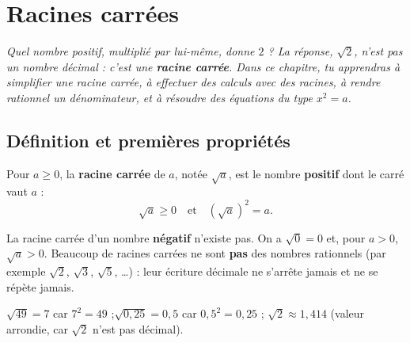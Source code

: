 \chapter{Racines carrées}

\noindent\textit{Quel nombre positif, multiplié par lui-même, donne $2$ ? La réponse,
$\sqrt2$, n'est pas un nombre décimal : c'est une \textbf{racine carrée}. Dans ce chapitre,
tu apprendras à simplifier une racine carrée, à effectuer des calculs avec des racines, à
rendre rationnel un dénominateur, et à résoudre des équations du type $x^{2}=a$.}
\vspace{8pt}

\connecteBanner

\section{Définition et premières propriétés}

\begin{definition}
Pour $a\ge0$, la \textbf{racine carrée} de $a$, notée $\sqrt a$, est le nombre
\textbf{positif} dont le carré vaut $a$ :
\[
\sqrt a\ge0 \quad\text{et}\quad \left(\sqrt a\right)^{2}=a.
\]
\end{definition}

\begin{remarque}
La racine carrée d'un nombre \textbf{négatif} n'existe pas. On a $\sqrt0=0$ et, pour $a>0$,
$\sqrt a>0$. Beaucoup de racines carrées ne sont \textbf{pas} des nombres rationnels (par
exemple $\sqrt2$, $\sqrt3$, $\sqrt5$, \ldots) : leur écriture décimale ne s'arrête jamais et
ne se répète jamais.
\end{remarque}

\begin{exemple}
$\sqrt{49}=7$ car $7^{2}=49$ ;\quad $\sqrt{0{,}25}=0{,}5$ car $0{,}5^{2}=0{,}25$ ;\quad
$\sqrt2\approx1{,}414$ (valeur arrondie, car $\sqrt2$ n'est pas décimal).
\end{exemple}

\begin{illus}
\end{illus}

